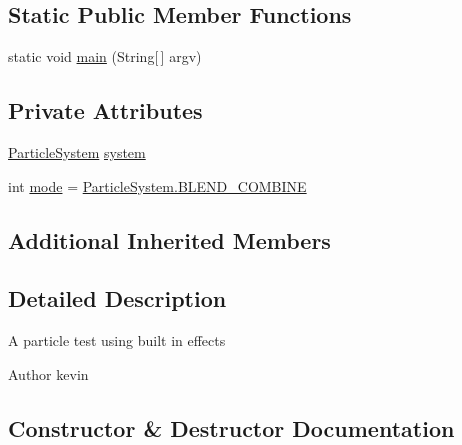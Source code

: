 \subsection*{Static Public Member Functions}
\begin{DoxyCompactItemize}
\item 
static void \mbox{\hyperlink{classorg_1_1newdawn_1_1slick_1_1tests_1_1_particle_test_aa708c2723baf40eb37de30abf2c5f556}{main}} (String\mbox{[}$\,$\mbox{]} argv)
\end{DoxyCompactItemize}
\subsection*{Private Attributes}
\begin{DoxyCompactItemize}
\item 
\mbox{\hyperlink{classorg_1_1newdawn_1_1slick_1_1particles_1_1_particle_system}{Particle\+System}} \mbox{\hyperlink{classorg_1_1newdawn_1_1slick_1_1tests_1_1_particle_test_a6daed8a7245faff147f4e66159df9c0d}{system}}
\item 
int \mbox{\hyperlink{classorg_1_1newdawn_1_1slick_1_1tests_1_1_particle_test_a3672703408b8d6f2d94e63765339d4a8}{mode}} = \mbox{\hyperlink{classorg_1_1newdawn_1_1slick_1_1particles_1_1_particle_system_a6e5a43dd58a794750f52fa0df8282e75}{Particle\+System.\+B\+L\+E\+N\+D\+\_\+\+C\+O\+M\+B\+I\+NE}}
\end{DoxyCompactItemize}
\subsection*{Additional Inherited Members}


\subsection{Detailed Description}
A particle test using built in effects

\begin{DoxyAuthor}{Author}
kevin 
\end{DoxyAuthor}


\subsection{Constructor \& Destructor Documentation}
\mbox{\label{classorg_1_1newdawn_1_1slick_1_1tests_1_1_particle_test_a0fcfc9b3093b3b35f8935b27c633c1d6}} 
